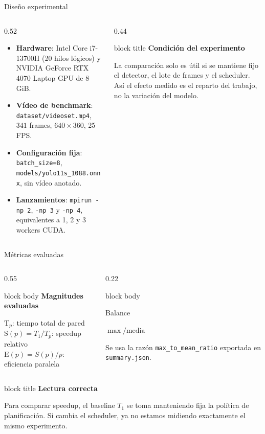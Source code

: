 \documentclass[aspectratio=169,11pt]{beamer}
\newcommand{\metriccard}[3]{
  \begin{beamercolorbox}[wd=\linewidth,sep=0.65em,rounded=true,shadow=false]{block body}
    {\small\color{GraphGray}#1\par}
    \vspace{0.1em}
    {\bfseries\fontsize{16}{18}\selectfont #2\par}
    \vspace{0.1em}
    {\footnotesize #3\par}
  \end{beamercolorbox}
}
\newcommand{\callout}[2]{
  \begin{beamercolorbox}[wd=\linewidth,sep=0.6em,rounded=true,shadow=false]{block title}
    {\bfseries #1}\par
    \vspace{0.15em}
    {\footnotesize #2}
  \end{beamercolorbox}
}
\begin{document}
\begin{frame}{Diseño experimental}
  \small
  \begin{columns}[T,totalwidth=\textwidth]
    \begin{column}{0.52\textwidth}
      \begin{itemize}
        \item \textbf{Hardware}: Intel Core i7-13700H (20 hilos lógicos) y NVIDIA GeForce RTX 4070 Laptop GPU de 8 GiB.
        \item \textbf{Vídeo de benchmark}: \texttt{dataset/videoset.mp4}, \(341\) frames, \(640\times360\), 25 FPS.
        \item \textbf{Configuración fija}: \texttt{batch\_size=8}, \texttt{models/yolo11s\_1088.onnx}, sin vídeo anotado.
        \item \textbf{Lanzamientos}: \texttt{mpirun -np 2}, \texttt{-np 3} y \texttt{-np 4}, equivalentes a 1, 2 y 3 workers CUDA.
      \end{itemize}
    \end{column}
    \begin{column}{0.44\textwidth}
      \callout{Condición del experimento}{
        La comparación solo es útil si se mantiene fijo el detector, el lote de frames y el scheduler. Así el efecto medido es el reparto del trabajo, no la variación del modelo.}
    \end{column}
  \end{columns}
\end{frame}

\begin{frame}{Métricas evaluadas}
  \small
  \begin{columns}[T,totalwidth=\textwidth]
    \begin{column}{0.55\textwidth}
      \begin{beamercolorbox}[wd=\linewidth,sep=0.7em,rounded=true,shadow=false]{block body}
        {\bfseries Magnitudes evaluadas}\par
        \vspace{0.2em}
        \footnotesize
        \(\mathrm{T}_p\): tiempo total de pared\\
        \(\mathrm{S}(p)=T_1/T_p\): speedup relativo\\
        \(\mathrm{E}(p)=S(p)/p\): eficiencia paralela
      \end{beamercolorbox}
    \end{column}
    \begin{column}{0.22\textwidth}
      \metriccard{Balance}{\(\max/\text{media}\)}{Se usa la razón \texttt{max\_to\_mean\_ratio} exportada en \texttt{summary.json}.}
    \end{column}
  \end{columns}

  \vspace{0.35em}
  \callout{Lectura correcta}{
    Para comparar speedup, el baseline \(T_1\) se toma manteniendo fija la política de planificación. Si cambia el scheduler, ya no estamos midiendo exactamente el mismo experimento.}
  \end{frame}
\end{document}
